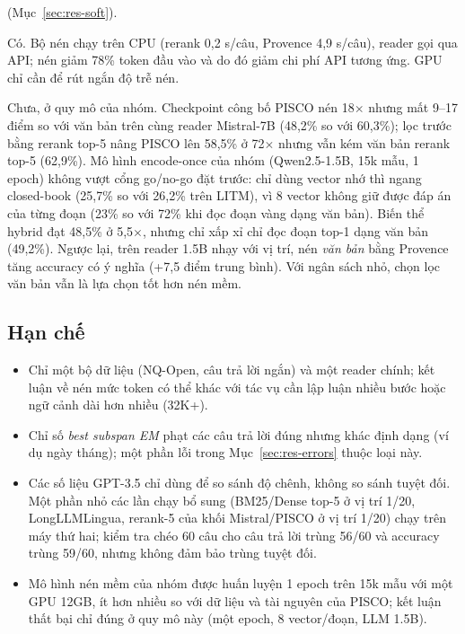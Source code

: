 \begin{description}[leftmargin=2.6em,labelindent=0pt]
  (Mục~\ref{sec:res-soft}).
  \item[RQ4.] Có. Bộ nén chạy trên CPU (rerank 0,2 s/câu, Provence 4,9 s/câu), reader gọi qua API;
  nén giảm 78\% token đầu vào và do đó giảm chi phí API tương ứng. GPU chỉ cần để rút ngắn độ trễ
  nén.
  \item[RQ5.] Chưa, ở quy mô của nhóm. Checkpoint công bố PISCO nén 18$\times$ nhưng mất 9--17 điểm so
  với văn bản trên cùng reader Mistral-7B (48,2\% so với 60,3\%); lọc trước bằng rerank top-5 nâng PISCO
  lên 58,5\% ở 72$\times$ nhưng vẫn kém văn bản rerank top-5 (62,9\%). Mô hình encode-once của nhóm
  (Qwen2.5-1.5B, 15k mẫu, 1 epoch) không vượt cổng go/no-go đặt trước: chỉ dùng vector nhớ thì ngang
  closed-book (25,7\% so với 26,2\% trên LITM), vì 8 vector không giữ được đáp án của từng đoạn (23\%
  so với 72\% khi đọc đoạn vàng dạng văn bản). Biến thể hybrid đạt 48,5\% ở 5,5$\times$, nhưng chỉ xấp xỉ
  chỉ đọc đoạn top-1 dạng văn bản (49,2\%). Ngược lại, trên reader 1.5B nhạy với vị trí, nén
  \emph{văn bản} bằng Provence tăng accuracy có ý nghĩa (+7,5 điểm trung bình). Với ngân sách nhỏ,
  chọn lọc văn bản vẫn là lựa chọn tốt hơn nén mềm.
\end{description}

\subsection{Hạn chế}

\begin{itemize}
  \item Chỉ một bộ dữ liệu (NQ-Open, câu trả lời ngắn) và một reader chính; kết luận về nén mức token
  có thể khác với tác vụ cần lập luận nhiều bước hoặc ngữ cảnh dài hơn nhiều (32K+).
  \item Chỉ số \emph{best subspan EM} phạt các câu trả lời đúng nhưng khác định dạng (ví dụ ngày
  tháng); một phần lỗi trong Mục~\ref{sec:res-errors} thuộc loại này.
  \item Các số liệu GPT-3.5 chỉ dùng để so sánh độ chênh, không so sánh tuyệt đối. Một phần nhỏ các lần
  chạy bổ sung (BM25/Dense top-5 ở vị trí 1/20, LongLLMLingua, rerank-5 của khối Mistral/PISCO ở vị trí 1/20) chạy trên
  máy thứ hai; kiểm tra chéo 60 câu cho câu trả lời trùng 56/60 và accuracy trùng 59/60, nhưng không đảm bảo trùng tuyệt đối.
  \item Mô hình nén mềm của nhóm được huấn luyện 1 epoch trên 15k mẫu với một GPU 12GB, ít hơn nhiều
  so với dữ liệu và tài nguyên của PISCO; kết luận thất bại chỉ đúng ở quy mô này (một epoch, 8
  vector/đoạn, LLM 1.5B).
\end{itemize}

